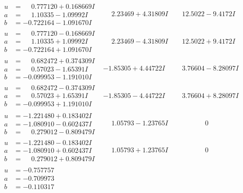 \documentclass[1p]{elsarticle_modified}
\theoremstyle{definition}
\begin{document}
$$\begin{array}{c|c|c}
\begin{aligned}
u &= \phantom{-}0.777120 + 0.168669 I \\
a &= \phantom{-}1.10335 - 1.09992 I \\
b &= -0.722164 - 1.091670 I\end{aligned}
 & \phantom{-}2.23469 + 4.31809 I & \phantom{-}12.5022 - 9.4172 I \\ \hline\begin{aligned}
u &= \phantom{-}0.777120 - 0.168669 I \\
a &= \phantom{-}1.10335 + 1.09992 I \\
b &= -0.722164 + 1.091670 I\end{aligned}
 & \phantom{-}2.23469 - 4.31809 I & \phantom{-}12.5022 + 9.4172 I \\ \hline\begin{aligned}
u &= \phantom{-}0.682472 + 0.374309 I \\
a &= \phantom{-}0.57023 - 1.65391 I \\
b &= -0.099953 - 1.191010 I\end{aligned}
 & -1.85305 + 4.44722 I & \phantom{-}3.76604 - 8.28097 I \\ \hline\begin{aligned}
u &= \phantom{-}0.682472 - 0.374309 I \\
a &= \phantom{-}0.57023 + 1.65391 I \\
b &= -0.099953 + 1.191010 I\end{aligned}
 & -1.85305 - 4.44722 I & \phantom{-}3.76604 + 8.28097 I \\ \hline\begin{aligned}
u &= -1.221480 + 0.183402 I \\
a &= -1.080910 - 0.602437 I \\
b &= \phantom{-}0.279012 - 0.809479 I\end{aligned}
 & \phantom{-}1.05793 - 1.23765 I & \phantom{-0.000000 } 0 \\ \hline\begin{aligned}
u &= -1.221480 - 0.183402 I \\
a &= -1.080910 + 0.602437 I \\
b &= \phantom{-}0.279012 + 0.809479 I\end{aligned}
 & \phantom{-}1.05793 + 1.23765 I & \phantom{-0.000000 } 0 \\ \hline\begin{aligned}
u &= -0.757757\phantom{ +0.000000I} \\
a &= -0.709973\phantom{ +0.000000I} \\
b &= -0.110317\phantom{ +0.000000I}\end{aligned}

\end{array}$$
\end{document}
